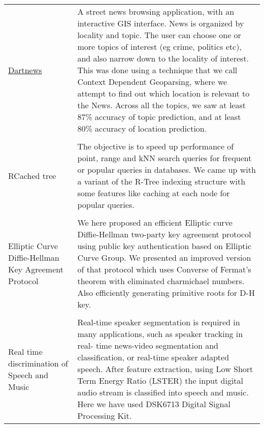 \documentclass[8pt]{article}
\begin{document}
\begin{tabular}[t]{@{}p{\textwidth-\rcollength-130pt}p{\rcollength+130pt}}
       \\ 
       \href{http://github.com/debjyoti385/dartnews}{Dartnews}   & \hspace{0.5cm} A street news browsing application, with an interactive GIS interface. News is organized by locality and topic. The user can choose one or more topics of interest (eg crime, politics etc), and also narrow down to the locality of interest. This was done using a technique that we call Context Dependent Geoparsing, where we attempt to find out which location is relevant to the News. Across all the topics, we saw at least 87\% accuracy of topic prediction, and at least 80\% accuracy of location prediction.\\
       \\ 
        RCached tree & \hspace{0.5cm} The objective is to speed up performance of point, range and kNN search queries for frequent or popular queries in databases. We came up with a variant of the R-Tree indexing structure with some features like caching at each node for popular queries.\\ 
       \\ 
       Elliptic Curve Diffie-Hellman Key Agreement Protocol    & \hspace{0.5cm} We here proposed an efficient Elliptic curve Diffie-Hellman two-party key agreement protocol using public key authentication based on Elliptic Curve Group. We presented an improved version of that protocol which uses Converse of Fermat’s theorem with eliminated charmichael numbers. Also efficiently generating primitive roots for D-H key.\\
       \\ 
Real time discrimination of Speech and Music & Real-time speaker segmentation is required in many applications, such as speaker tracking in real- time news-video segmentation and classification, or real-time speaker adapted speech. After feature extraction, using Low Short Term Energy Ratio (LSTER) the input digital audio stream is classified into speech and music. Here we have used DSK6713 Digital Signal Processing Kit.\\

\end{tabular}
\end{document}
